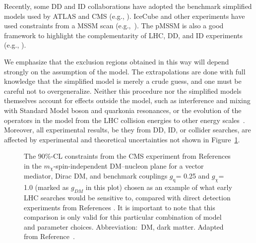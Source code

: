 \documentclass{ar-1col}
\newcommand{\chiDM}{\ensuremath{\chi}\xspace}
\newcommand{\gDM}{\ensuremath{g_{\chiDM}}\xspace}
\newcommand{\gdm}{\gDM}
\newcommand{\gq}{$g_{\mathrm{q}}$\xspace}
\newcommand{\mdm}{\ensuremath{m_{\chiDM}}\xspace}
\begin{document}
{Recently, some DD and ID collaborations have adopted the benchmark
simplified models used by ATLAS and CMS (e.g.,
). IceCube and other
experiments have used constraints from a MSSM scan (e.g.,~). The pMSSM is also a good framework
to highlight the complementarity of LHC, DD, and ID experiments (e.g.,
).

\begin{marginnote}[]
\end{marginnote}

We emphasize that the exclusion regions obtained in this
way will depend strongly on the assumption of the model. The
extrapolations are done with full knowledge that the simplified
model is merely a crude guess, and one must be careful not to
overgeneralize. Neither this procedure nor the
simplified models themselves account for effects outside the
model, such as interference and mixing with Standard Model boson and quarkonia
resonances, or the evolution of the operators in the model from
the LHC collision energies to other energy
scales~\cite{DEramo:2014nmf}. Moreover, all experimental results,
be they from DD, ID, or collider searches, are affected by experimental and
theoretical uncertainties not shown in Figure~\ref{fig:SICMS}.

\begin{figure}[!htpb]
\caption{The 90\%-CL constraints from the CMS experiment 
from References \cite{Sirunyan:2017nvi,Sirunyan:2018xlo,Sirunyan:2017jix,CMS-PAS-EXO-16-053,Sirunyan:2017qfc}
in the \mdm-spin-independent DM--nucleon plane for a vector mediator,
Dirac DM, and benchmark couplings \gq = 0.25 and \gdm = 1.0 (marked as $g_{DM}$ in this plot) chosen as an example of what
early LHC searches would be sensitive to, compared with direct detection
experiments from References \cite{Angloher:2015ewa,Agnese:2015nto,Cui:2017nnn,Akerib:2016vxi,Aprile:2018dbl}. 
It is important to note that this comparison is only valid for this particular
combination of model and parameter choices. 
Abbreviation:\ DM, dark matter. Adapted from Reference~.} \label{fig:SICMS}
\end{figure}

}
\end{document}

